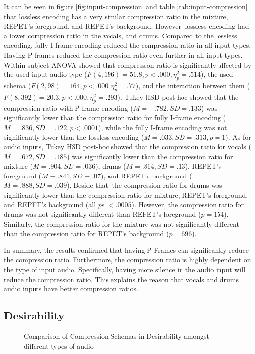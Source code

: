 It can be seen in figure \ref{fig:input-compression} and table \ref{tab:input-compression} that lossless encoding has a very similar compression ratio in the mixture, REPET's foreground, and REPET's background.
However, lossless encoding had a lower compression ratio in the vocals, and drums.
Compared to the lossless encoding, fully I-frame encoding reduced the compression ratio in all input types.
Having P-frames reduced the compression ratio even further in all input types.
Within-subject ANOVA showed that compression ratio is significantly affected by the used input audio type ($F(4,196)=51.8, p<.000, \eta_{p}^{2}=.514$), the used schema ($F(2,98)=164, p<.000, \eta_{p}^{2}=.77$), and the interaction between them ($F(8,392)=20.3, p<.000, \eta_{p}^{2}=.293$).
Tukey HSD post-hoc showed that the compression ratio with P-frame encoding ($M=-.782, SD=.133$) was significantly lower than the compression ratio for fully I-frame encoding ($M=.836, SD=.122, p<.0001$), while the fully I-frame encoding was not significantly lower than the lossless encoding ($M=.033, SD=.313, p=1$).
As for audio inputs, Tukey HSD post-hoc showed that the compression ratio for vocals ($M=.672, SD=.185$) was significantly lower than the compression ratio for mixture ($M=.904, SD=.036$), drums ($M=.814, SD=.13$), REPET's foreground ($M=.841, SD=.07$), and REPET's background ($M=.888, SD=.039$).
Beside that, the compression ratio for drums was significantly lower than the compression ratio for mixture, REPET's foreground, and REPET's background (all $p$s $<.0005$).
However, the compression ratio for drums was not significantly different than REPET's foreground ($p=154$). Similarly, the compression ratio for the mixture was not significantly different than the compression ratio for REPET's background ($p=696$).

In summary, the results confirmed that having P-Frames can significantly reduce the compression ratio.
Furthermore, the compression ratio is highly dependent on the type of input audio. Specifically, having more silence in the audio input will reduce the compression ratio.
This explains the reason that vocals and drums audio inputs have better compression ratios.

\subsection{Desirability}

\begin{figure}[ht]
  
  \caption{Comparison of Compression Schemas in Desirability amongst different types of audio}
  \label{fig:input-desirable}
\end{figure}


